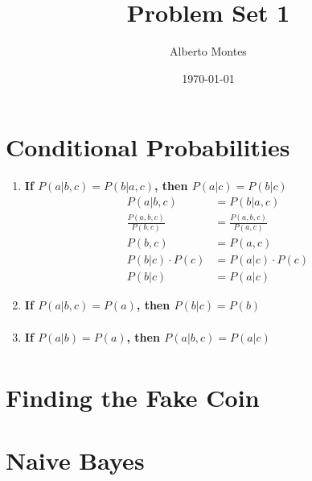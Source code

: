 \documentclass{ethz_report}
\title{Problem Set 1}
\author{Alberto Montes}
\date{\today}
\numberwithin{equation}{section}
\begin{document}
\maketitle

\section{Conditional Probabilities}

\begin{enumerate}[label=(\alph*)]
    \item \textbf{If $P(a|b,c) = P(b|a,c)$, then $P(a|c) = P(b|c)$}
    \begin{subequations}
        \begin{align}
            P(a|b,c) &= P(b|a,c)\\
            \frac{P(a,b,c)}{P(b,c)} &= \frac{P(a,b,c)}{P(a,c)}\\
            P(b,c) &= P(a,c)\\
            P(b|c) \cdot P(c) &= P(a|c) \cdot P(c)\\
            P(b|c) &= P(a|c)
        \end{align}
    \end{subequations}

    \item \textbf{If $P(a|b,c) = P(a)$, then $P(b|c) = P(b)$}
    \begin{subequations}
        \begin{align}

        \end{align}
    \end{subequations}

    \item \textbf{If $P(a|b) = P(a)$, then $P(a|b,c) = P(a|c)$}
    \begin{subequations}
        \begin{align}

        \end{align}
    \end{subequations}

\end{enumerate}

\section{Finding the Fake Coin}

\section{Naive Bayes}
\end{document}
